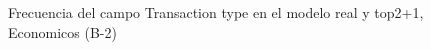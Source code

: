 \begin{figure}[H]
    \centering
    
    \caption{Frecuencia del campo Transaction type en el modelo real y top2+1, Economicos (B-2)}
    \label{frecuency-Transaction Type-top2+1}
\end{figure}